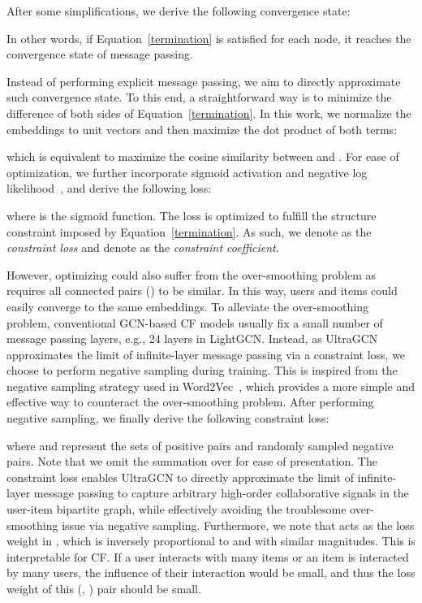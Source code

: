 \documentclass[sigconf,authorversion]{acmart}
\begin{document}
After some simplifications, we derive the following convergence state:

In other words, if Equation~\ref{termination} is satisfied for each node, it reaches the convergence state of message passing. 

Instead of performing explicit message passing, we aim to directly approximate such convergence state. To this end, a straightforward way is to minimize the difference of both sides of Equation~\ref{termination}. In this work, we normalize the embeddings to unit vectors and then maximize the dot product of both terms:

which is equivalent to maximize the cosine similarity between  and . For ease of optimization, we further incorporate sigmoid activation and negative log likelihood~\cite{cross_entropy_support}, and derive the following loss:

where  is the sigmoid function. The loss is optimized to fulfill the structure constraint imposed by Equation~\ref{termination}. As such, we denote  as the \textit{constraint loss} and denote  as the \textit{constraint coefficient}. 



However, optimizing  could also suffer from the over-smoothing problem as  requires all connected pairs () to be similar. In this way, users and items could easily converge to the same embeddings. 
To alleviate the over-smoothing problem, conventional GCN-based CF models usually fix a small number of message passing layers, e.g., 24 layers in LightGCN. Instead, as UltraGCN approximates the limit of infinite-layer message passing via a constraint loss, we choose to perform negative sampling during training. This is inspired from the negative sampling strategy used in Word2Vec~\cite{word2vec}, which provides a more simple and effective way to counteract the over-smoothing problem. 
After performing negative sampling, we finally derive the following constraint loss:

where  and  represent the sets of positive pairs and randomly sampled negative pairs. Note that we omit the summation over  for ease of presentation.
The constraint loss  enables UltraGCN to directly approximate the limit of infinite-layer message passing to capture arbitrary high-order collaborative signals in the user-item bipartite graph, while effectively avoiding the troublesome over-smoothing issue via negative sampling.  
Furthermore, we note that  acts as the loss weight in , which is inversely proportional to  and  with similar magnitudes. This is interpretable for CF. If a user interacts with many items or an item is interacted by many users, the influence of their interaction would be small, and thus the loss weight of this (, ) pair should be small.
\end{document}
